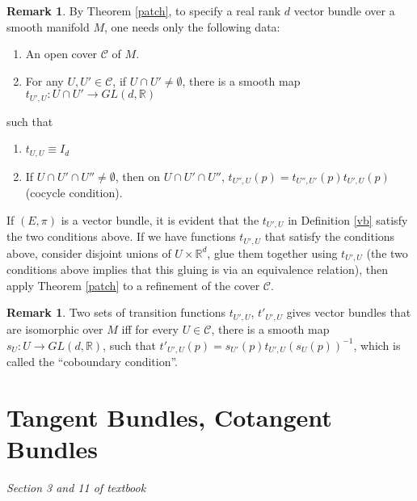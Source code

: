 \documentclass{article}
\theoremstyle{definition}
\newtheorem{rmk}[thm]{Remark}
\begin{document}
\begin{rmk}\label{tvb}
By Theorem \ref{patch}, to specify a real rank $d$ vector bundle over a smooth manifold $M$, one needs only the following data:
\begin{enumerate}
    \item An open cover $\mathcal{C}$ of $M$.
    \item For any $U, U'\in \mathcal{C}$, if $U\cap U'\not=\emptyset$, there is a smooth map $t_{U', U}: U\cap U'\rightarrow GL(d, \mathbb{R})$
\end{enumerate}
such that
\begin{enumerate}
    \item $t_{U, U}\equiv I_d$
    \item If $U\cap U'\cap U''\not=\emptyset$, then on $U\cap U'\cap U''$, $t_{U'', U}(p)=t_{U'', U'}(p)t_{U', U}(p)$ (cocycle condition).
\end{enumerate}
If $(E, \pi)$ is a vector bundle, it is evident that the $t_{U', U}$ in Definition \ref{vb} satisfy the two conditions above. If we have functions $t_{U', U}$ that satisfy the conditions above, consider disjoint unions of $U\times\mathbb{R}^d$, glue them together using $t_{U', U}$ (the two conditions above implies that this gluing is via an equivalence relation), then apply Theorem \ref{patch} to a refinement of the cover $\mathcal{C}$.
\end{rmk}

\begin{rmk}
    Two sets of transition functions $t_{U', U}$, $t'_{U', U}$ gives vector bundles that are isomorphic over $M$ iff for every $U\in\mathcal{C}$, there is a smooth map $s_U: U\rightarrow GL(d, \mathbb{R})$, such that $t'_{U', U}(p)=s_{U'}(p)t_{U', U}(s_{U}(p))^{-1}$, which is called the ``coboundary condition''.
\end{rmk}

\newpage

\section{Tangent Bundles, Cotangent Bundles}

{\em Section 3 and 11 of textbook}\\
\end{document}
